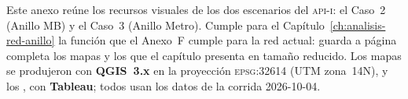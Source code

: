 %
%

Este anexo reúne los recursos visuales de los dos escenarios del
\textsc{api-i}: el Caso~2 (Anillo MB) y el Caso~3 (Anillo Metro). Cumple para
el Capítulo~\ref{ch:analisis-red-anillo} la función que el Anexo~F cumple para
la red actual: guarda a página completa los mapas y los 
que el capítulo presenta en tamaño reducido. Los mapas se produjeron con
\textbf{QGIS~3.x} en la proyección \textsc{epsg}:32614 (UTM zona~14N), y los
, con \textbf{Tableau}; todos usan los datos de la corrida
2026-10-04.

